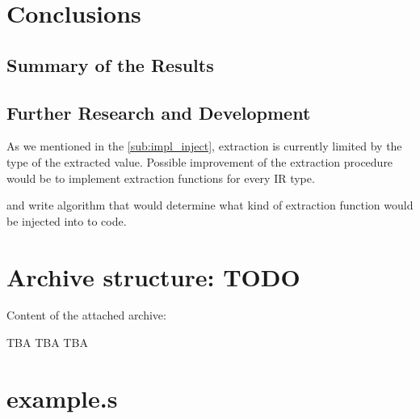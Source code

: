\documentclass[12pt, twoside]{fithesis2}
\renewcommand{\_}{\leavevmode \kern0.07em\vbox{\hrule width0.4em}}
\begin{document}
\chapter{Conclusions}
\label{chap:conclusions}

\section{Summary of the Results}
\label{sec:conclusions-summary}


\section{Further Research and Development}
\label{sec:conclusions-next}


As we mentioned in the \autoref{sub:impl_inject}, extraction is currently limited
by the type of the extracted value.
Possible improvement of the extraction procedure would be to implement
extraction functions for every IR type.

and write algorithm that would determine
what kind of extraction function would be injected into to code.



\appendix

\printbibliography

\chapter{Archive structure: TODO}
\label{appendix:archive}

Content of the attached archive:

TBA TBA TBA


\chapter{example.s}
\label{appendix:example}
\end{document}
